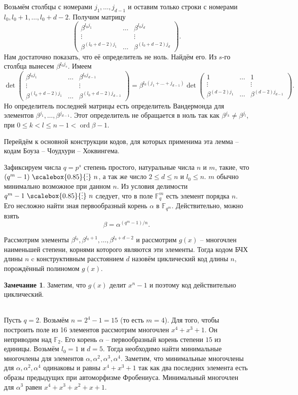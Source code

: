 \documentclass[12pt,a4paper,oneside]{book}
\theoremstyle{definition}
\newtheorem*{rem}{\color{green!50!blue}Замечание}
\renewcommand{\leq}{\leqslant}
\newcommand{\ord}{\operatorname{ord}}
\newcommand{\di}{\mathop{\,\scalebox{0.85}{\raisebox{-1.2pt}[0.5\height]{\vdots}}\,}}
\newcommand{\F}{\mathbb F}
\def\rm{\begin{rem}}
\def\erm{\end{rem}}
\def\pmat{\begin{pmatrix}}
\def\epmat{\end{pmatrix}}
\begin{document}
Возьмём столбцы с номерами $j_1,\dots,j_{d-1}$ и оставим только строки с номерами $l_0, l_0+1,\dots,l_0+d-2$. Получим матрицу 
$$ \pmat 
\beta^{l_0 j_1}& \dots &\beta^{l_0 j_d}\\
\vdots & & \vdots\\
\beta^{(l_0+d-2)j_1} & \dots & \beta^{(l_0+d-2)j_d} 
\epmat.$$
Нам достаточно показать, что её определитель не ноль. Найдём его. Из $s$-го столбца вынесем $\beta^{l_0j_s}$. Имеем
$$ \det \pmat 
\beta^{l_0 j_1}& \dots &\beta^{l_0 j_{d-1}}\\
\vdots & & \vdots\\
\beta^{(l_0+d-2)j_1} & \dots & \beta^{(l_0+d-2)j_{d-1}} 
\epmat = \beta^{l_0(j_1+\dots+j_{d-1})} \det  \pmat 
1& \dots &1\\
\vdots & & \vdots\\
\beta^{(d-2)j_1} & \dots & \beta^{(d-2)j_{d-1}} 
\epmat.$$
Но определитель последней матрицы есть определитель Вандермонда для элементов $\beta^{j_1}, \dots, \beta^{j_{d-1}}$. Этот определитель не обращается в ноль так как $\beta^{j_k}\neq \beta^{j_l}$, при $0\leq k< l\leq n-1< \ord \beta -1$.
\endproof

Перейдём к основной конструкции кодов, для которых применима эта лемма --  кодам Боуза -- Чоудхури -- Хоквингема.

Зафиксируем числа $q=p^s$ степень простого, натуральные числа $n$  и $m$, такие, что $(q^m-1)\di n$, а так же число $2\leq d\leq n$ и $l_0 \leq n$. $m$ обычно минимально возможное при данном $n$. Из условия делимости $q^m-1\di n$ следует, что в поле $\F_q^m$ есть элемент порядка $n$. Его несложно найти зная первообразный корень $\alpha$ в $\F_{q^m}$. Действительно, можно взять 
$$\beta=\alpha^{(q^m-1)/n}.$$ 

Рассмотрим элементы $\beta^{l_0},\beta^{l_0+1},\dots, \beta^{l_0+d-2}$ и рассмотрим $g(x)$ -- многочлен наименьшей степени, корнями которого являются эти элементы. Тогда кодом БЧХ длины $n$ c конструктивным расстоянием $d$ назовём циклический код длины $n$, порождённый полиномом $g(x)$.

\rm
Заметим, что $g(x)$ делит $x^n-1$ и поэтому код действительно циклический.
\erm

\\
Пусть $q=2$. Возьмём $n=2^4-1=15$ (то есть $m=4$). Для того, чтобы построить поле из 16 элементов рассмотрим многочлен $x^4+x^3+1$. Он неприводим над $\F_2$. Его корень $\alpha$ -- первообразный корень степени $15$ из единицы. Возьмём $l_0=1$ и $d=5$. Тогда необходимо найти минимальные многочлены для элементов $\alpha,\alpha^2,\alpha^3,\alpha^4$. Заметим, что минимальные многочлены для $\alpha,\alpha^2,\alpha^4$ одинаковы и равны $x^4+x^3+1$ так как два последних элемента есть образы предыдущих при автоморфизме Фробениуса. Минимальный многочлен для $\alpha^3$ равен $x^4+x^3+x^2+x+1$. 
\end{document}
